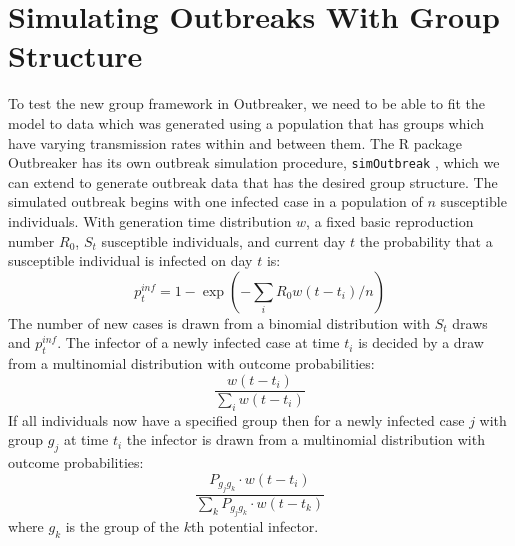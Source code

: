 \documentclass[11pt,a4paper]{report}
\begin{document}
\section{Simulating Outbreaks With Group Structure}
To test the new group framework in Outbreaker, we need to be able to fit the model to data which was generated using a population that has groups which have varying transmission rates within and between them. The R package Outbreaker has its own outbreak simulation procedure, {\tt simOutbreak} \citep{outbrkr}, which we can extend to generate outbreak data that has the desired group structure. The simulated outbreak begins with one infected case in a population of $n$ susceptible individuals. With generation time distribution $w$, a fixed basic reproduction number $R_0$, $S_t$ susceptible individuals, and current day $t$ the probability that a susceptible individual is infected on day $t$ is:
\begin{equation}
p^{inf}_t = 1 - \exp{(-\sum_{i} R_{0}w(t-t_i)/n)}
\end{equation}  
The number of new cases is drawn from a binomial distribution with $S_t$ draws and $p^{inf}_t$. The infector of a newly infected case at time $t_i$ is decided by a draw from a multinomial distribution with outcome probabilities: 
\begin{equation}
 \frac{w(t-t_i)}{\sum_i{w(t-t_i)}}
\end{equation}
If all individuals now have a specified group then for a newly infected case $j$ with group $g_j$ at time $t_i$ the infector is drawn from a multinomial distribution with outcome probabilities:
\begin{equation}
 \frac{P_{g_{j}g_{k}} \cdot w(t-t_i)}{\sum_k{P_{g_{j}g_{k}} \cdot w(t-t_k)}}
\end{equation}
where $g_{k}$ is the group of the $k$th potential infector.
\end{document}
